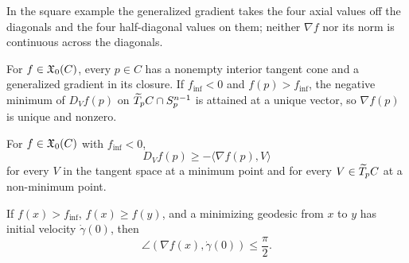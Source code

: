 \begin{remark}
\label{rem:chow-iii-h35-square-gradient}
In the square example the generalized gradient takes the four axial values off the
diagonals and the four half-diagonal values on them; neither $\nabla f$ nor its norm
is continuous across the diagonals.
\end{remark}

\begin{lemma}
\label{lem:chow-iii-h36-unique-generalized-gradient}

For $f\in\mathfrak X_0(C)$, every $p\in C$ has a nonempty interior tangent cone and a
generalized gradient in its closure.  If $f_{\inf}<0$ and $f(p)>f_{\inf}$, the negative
minimum of $D_Vf(p)$ on $\widetilde T_pC\cap S_p^{n-1}$ is attained at a unique vector, so
$\nabla f(p)$ is unique and nonzero.
\end{lemma}

\begin{lemma}
\label{lem:chow-iii-h37-directional-gradient-inequality}

For $f\in\mathfrak X_0(C)$ with $f_{\inf}<0$,
\[
D_Vf(p)\ge-\langle\nabla f(p),V\rangle
\]
for every $V$ in the tangent space at a minimum point and for every $V\in\widetilde T_pC$
at a non-minimum point.
\end{lemma}

\begin{lemma}
\label{lem:chow-iii-h38-acute-angle}

If $f(x)>f_{\inf}$, $f(x)\ge f(y)$, and a minimizing geodesic from $x$ to $y$ has
initial velocity $\dot\gamma(0)$, then
\[
\angle(\nabla f(x),\dot\gamma(0))\le\frac\pi2.
\]
\end{lemma}

